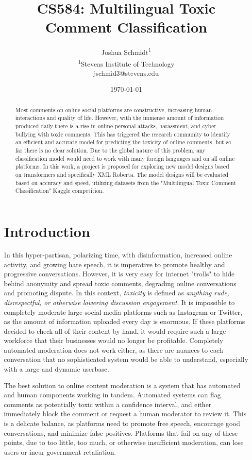 \documentclass{article}
\title{CS584: Multilingual Toxic Comment Classification} %
\author{
Joshua Schmidt\textsuperscript{1}\\
\textsuperscript{1}{Stevens Institute of Technology}\\
jschmid3@stevens.edu
}
\date{\today}
\begin{document}
\maketitle
\begin{abstract}

Most comments on online social platforms are constructive, increasing human interactions and quality of life. However, with the immense amount of information produced daily there is a rise in online personal attacks, harassment, and cyber-bullying with toxic comments. This has triggered the research community to identify an efficient and accurate model for predicting the toxicity of online comments, but so far there is no clear solution. Due to the global nature of this problem, any classification model would need to work with many foreign languages and on all online platforms. In this work, a project is proposed for exploring new model designs based on transformers and specifically XML Roberta. The model designs will be evaluated based on accuracy and speed, utilizing datasets from the "Multilingual Toxic Comment Classification" Kaggle competition.

\end{abstract}

\section{Introduction}

In this hyper-partisan, polarizing time, with disinformation, increased online activity, and growing hate speech, it is imperative to promote healthy and progressive conversations. However, it is very easy for internet "trolls" to hide behind anonymity and spread toxic comments, degrading online conversations and promoting dispute. In this context, \textit{toxicity} is defined as \textit{anything rude, disrespectful, or otherwise lowering discussion engagement}. It is impossible to completely moderate large social media platforms such as Instagram or Twitter, as the amount of information uploaded every day is enormous. If these platforms decided to check all of their content by hand, it would require such a large workforce that their businesses would no longer be profitable. Completely automated moderation does not work either, as there are nuances to each conversation that no sophisticated system would be able to understand, especially with a large and dynamic userbase.

The best solution to online content moderation is a system that has automated and human components working in tandem. Automated systems can flag comments as potentially toxic within a confidence interval, and either immediately block the comment or request a human moderator to review it. This is a delicate balance, as platforms need to promote free speech, encourage good conversations, and minimize false-positives. Platforms that fail on any of these points, due to too little, too much, or otherwise insufficient moderation, can lose users or incur government retaliation.
\end{document}
